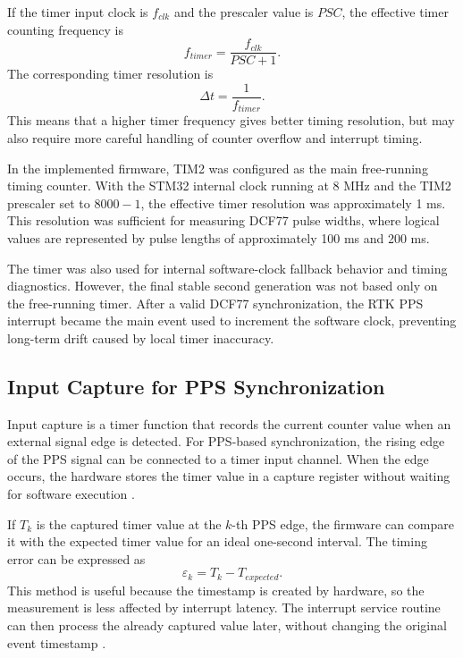 If the timer input clock is $f_{clk}$ and the prescaler value is $PSC$, the effective timer counting frequency is
\begin{equation}
f_{timer} = \frac{f_{clk}}{PSC + 1}.
\end{equation}
The corresponding timer resolution is
\begin{equation}
\Delta t = \frac{1}{f_{timer}}.
\end{equation}
This means that a higher timer frequency gives better timing resolution, but may also require more careful handling of counter overflow and interrupt timing.

In the implemented firmware, TIM2 was configured as the main free-running timing counter. With the STM32 internal clock running at 8 MHz and the TIM2 prescaler set to $8000 - 1$, the effective timer resolution was approximately 1 ms. This resolution was sufficient for measuring DCF77 pulse widths, where logical values are represented by pulse lengths of approximately 100 ms and 200 ms.

The timer was also used for internal software-clock fallback behavior and timing diagnostics. However, the final stable second generation was not based only on the free-running timer. After a valid DCF77 synchronization, the RTK PPS interrupt became the main event used to increment the software clock, preventing long-term drift caused by local timer inaccuracy.

\subsection{Input Capture for PPS Synchronization}

Input capture is a timer function that records the current counter value when an external signal edge is detected. For PPS-based synchronization, the rising edge of the PPS signal can be connected to a timer input channel. When the edge occurs, the hardware stores the timer value in a capture register without waiting for software execution \cite{stm32F0ReferenceManual}.

If $T_k$ is the captured timer value at the $k$-th PPS edge, the firmware can compare it with the expected timer value for an ideal one-second interval. The timing error can be expressed as
\begin{equation}
\varepsilon_k = T_k - T_{expected}.
\end{equation}
This method is useful because the timestamp is created by hardware, so the measurement is less affected by interrupt latency. The interrupt service routine can then process the already captured value later, without changing the original event timestamp \cite{kopetz2011realtime}.

